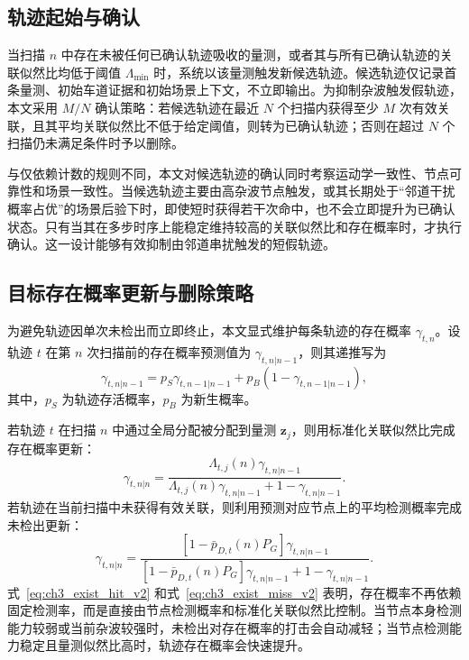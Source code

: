 \documentclass{xdupgthesis}
\begin{document}
\subsection{轨迹起始与确认}

当扫描 $n$ 中存在未被任何已确认轨迹吸收的量测，或者其与所有已确认轨迹的关联似然比均低于阈值 $\Lambda_{\min}$ 时，系统以该量测触发新候选轨迹。候选轨迹仅记录首条量测、初始车道证据和初始场景上下文，不立即输出。为抑制杂波触发假轨迹，本文采用 $M/N$ 确认策略：若候选轨迹在最近 $N$ 个扫描内获得至少 $M$ 次有效关联，且其平均关联似然比不低于给定阈值，则转为已确认轨迹；否则在超过 $N$ 个扫描仍未满足条件时予以删除。

与仅依赖计数的规则不同，本文对候选轨迹的确认同时考察运动学一致性、节点可靠性和场景一致性。当候选轨迹主要由高杂波节点触发，或其长期处于“邻道干扰概率占优”的场景后验下时，即使短时获得若干次命中，也不会立即提升为已确认状态。只有当其在多步时序上能稳定维持较高的关联似然比和存在概率时，才执行确认。这一设计能够有效抑制由邻道串扰触发的短假轨迹。

\subsection{目标存在概率更新与删除策略}

为避免轨迹因单次未检出而立即终止，本文显式维护每条轨迹的存在概率 $\gamma_{t,n}$。设轨迹 $t$ 在第 $n$ 次扫描前的存在概率预测值为 $\gamma_{t,n|n-1}$，则其递推写为
\begin{equation}
	\gamma_{t,n|n-1}=p_S\gamma_{t,n-1|n-1}+p_B\left(1-\gamma_{t,n-1|n-1}\right),
	\label{eq:ch3_exist_predict_v2}
\end{equation}
其中，$p_S$ 为轨迹存活概率，$p_B$ 为新生概率。

若轨迹 $t$ 在扫描 $n$ 中通过全局分配被分配到量测 $\mathbf z_j$，则用标准化关联似然比完成存在概率更新：
\begin{equation}
	\gamma_{t,n|n}=
	\frac{\Lambda_{t,j}(n)\gamma_{t,n|n-1}}{\Lambda_{t,j}(n)\gamma_{t,n|n-1}+1-\gamma_{t,n|n-1}}.
	\label{eq:ch3_exist_hit_v2}
\end{equation}
若轨迹在当前扫描中未获得有效关联，则利用预测对应节点上的平均检测概率完成未检出更新：
\begin{equation}
	\gamma_{t,n|n}=
	\frac{\left[1-\bar p_{D,t}(n)P_G\right]\gamma_{t,n|n-1}}{\left[1-\bar p_{D,t}(n)P_G\right]\gamma_{t,n|n-1}+1-\gamma_{t,n|n-1}}.
	\label{eq:ch3_exist_miss_v2}
\end{equation}
式~\eqref{eq:ch3_exist_hit_v2} 和式~\eqref{eq:ch3_exist_miss_v2} 表明，存在概率不再依赖固定检测率，而是直接由节点检测概率和标准化关联似然比控制。当节点本身检测能力较弱或当前杂波较强时，未检出对存在概率的打击会自动减轻；当节点检测能力稳定且量测似然比高时，轨迹存在概率会快速提升。
\end{document}
